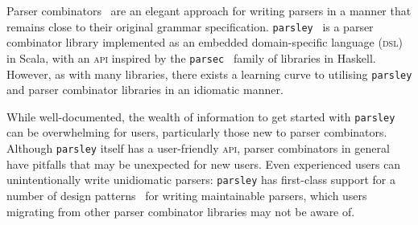 \documentclass[../../main.tex]{subfiles}
\begin{document}

Parser combinators~\cite{hutton_higher-order_1992} are an elegant approach for writing parsers in a manner that remains close to their original grammar specification.
\texttt{parsley}~\cite{willis_garnishing_2018} is a parser combinator library implemented as an embedded domain-specific language (\textsc{dsl})~\cite{hudak_building_1996} in Scala, with an \textsc{api} inspired by the \texttt{parsec}~\cite{leijen_parsec_2001} family of libraries in Haskell.
However, as with many libraries, there exists a learning curve to utilising \texttt{parsley} and parser combinator libraries in an idiomatic manner.

While well-documented, the wealth of information to get started with \texttt{parsley} can be overwhelming for users, particularly those new to parser combinators.
Although \texttt{parsley} itself has a user-friendly \textsc{api}, parser combinators in general have pitfalls that may be unexpected for new users.
Even experienced users can unintentionally write unidiomatic parsers: \texttt{parsley} has first-class support for a number of design patterns~\cite{willis_design_2022} for writing maintainable parsers, which users migrating from other parser combinator libraries may not be aware of.
\end{document}
